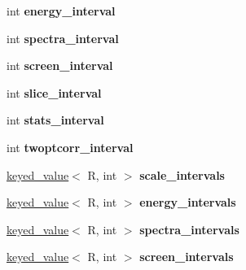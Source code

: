 \begin{DoxyCompactItemize}
\item 
\hypertarget{classmodel_abb1fa70dcb164b154962239d89549bba}{
int {\bfseries energy\_\-interval}}
\label{classmodel_abb1fa70dcb164b154962239d89549bba}

\item 
\hypertarget{classmodel_a6034345aff4e730e2d134fe4747173b3}{
int {\bfseries spectra\_\-interval}}
\label{classmodel_a6034345aff4e730e2d134fe4747173b3}

\item 
\hypertarget{classmodel_a6c573a2fe4aaed01e1f2fcde9f1228df}{
int {\bfseries screen\_\-interval}}
\label{classmodel_a6c573a2fe4aaed01e1f2fcde9f1228df}

\item 
\hypertarget{classmodel_a9561d067a967f20b946b94a2305d5501}{
int {\bfseries slice\_\-interval}}
\label{classmodel_a9561d067a967f20b946b94a2305d5501}

\item 
\hypertarget{classmodel_a5e477d9d154064d70e8da87fdc363603}{
int {\bfseries stats\_\-interval}}
\label{classmodel_a5e477d9d154064d70e8da87fdc363603}

\item 
\hypertarget{classmodel_abac663e2b450708b3d26a1c90c52541c}{
int {\bfseries twoptcorr\_\-interval}}
\label{classmodel_abac663e2b450708b3d26a1c90c52541c}

\item 
\hypertarget{classmodel_a32c9cb25d74703419261a56188cf08fd}{
\hyperlink{structkeyed__value}{keyed\_\-value}$<$ R, int $>$ {\bfseries scale\_\-intervals}}
\label{classmodel_a32c9cb25d74703419261a56188cf08fd}

\item 
\hypertarget{classmodel_aa3d0b02452be0ea6301ec2f9e5c4034d}{
\hyperlink{structkeyed__value}{keyed\_\-value}$<$ R, int $>$ {\bfseries energy\_\-intervals}}
\label{classmodel_aa3d0b02452be0ea6301ec2f9e5c4034d}

\item 
\hypertarget{classmodel_a71307003ff0cf775ac1ce91ee34bd0fd}{
\hyperlink{structkeyed__value}{keyed\_\-value}$<$ R, int $>$ {\bfseries spectra\_\-intervals}}
\label{classmodel_a71307003ff0cf775ac1ce91ee34bd0fd}

\item 
\hypertarget{classmodel_a486729c11cb76cce2cd07f127de92675}{
\hyperlink{structkeyed__value}{keyed\_\-value}$<$ R, int $>$ {\bfseries screen\_\-intervals}}
\label{classmodel_a486729c11cb76cce2cd07f127de92675}


\end{DoxyCompactItemize}
